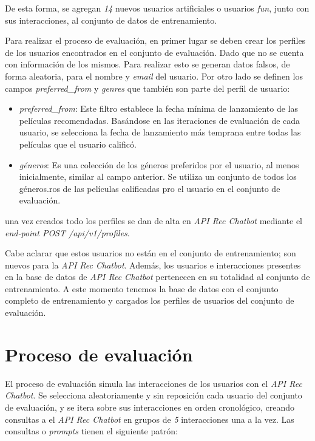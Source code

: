 \documentclass[11pt,a4paper,twoside]{thesis}
\begin{document}
De esta forma, se agregan \textit{14} nuevos usuarios artificiales o usuarios \textit{fun}, junto con sus interacciones, al conjunto de datos de entrenamiento.

Para realizar el proceso de evaluación, en primer lugar se deben crear los perfiles de los usuarios encontrados en el conjunto de evaluación. Dado que no se cuenta con información de los mismos. Para realizar esto se generan datos falsos, de forma aleatoria, para el nombre y \textit{email} del usuario. Por otro lado se definen los campos \textit{preferred\_from} y
\textit{genres} que también son parte del perfil de usuario:


\begin{itemize}
	\item \textit{preferred\_from}: Este filtro establece la fecha mínima de lanzamiento de las películas recomendadas. Basándose en las iteraciones de evaluación de cada usuario, se selecciona la fecha de lanzamiento más temprana entre todas las películas que el usuario calificó.
	\item \textit{géneros}: Es una colección de los géneros preferidos por el usuario, al menos inicialmente, similar al campo anterior. Se utiliza un conjunto de todos los géneros.ros de las películas calificadas pro el usuario en el conjunto de evaluación.
\end{itemize}


una vez creados todo los perfiles se dan de alta en \textit{API Rec Chatbot} mediante el \textit{end-point POST /api/v1/profiles}.

Cabe aclarar que estos usuarios no están en el conjunto de entrenamiento; son nuevos para la \textit{API Rec Chatbot}. Además, los usuarios e interacciones presentes en la base de datos de \textit{API Rec Chatbot} pertenecen en su totalidad al conjunto de entrenamiento. A este momento tenemos la base de datos con el conjunto completo de entrenamiento y cargados los perfiles de usuarios del conjunto de evaluación.

\section{Proceso de evaluación}

El proceso de evaluación simula las interacciones de los usuarios con el \textit{API Rec Chatbot}. Se selecciona aleatoriamente y sin reposición cada usuario del conjunto de evaluación, y se itera sobre sus interacciones en orden cronológico, creando consultas a el \textit{API Rec Chatbot} en grupos de \textit{5} interacciones una a la vez. Las consultas o \textit{prompts} tienen el siguiente patrón:
\end{document}
